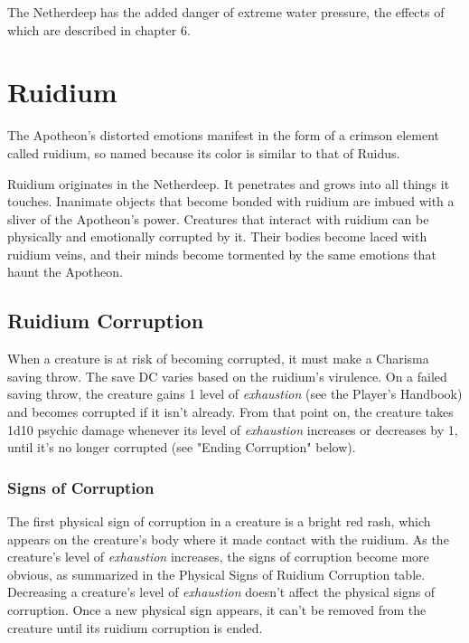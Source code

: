 \documentclass[a4paper, 11pt, bg=full, twocolumn, nooutline]{dndbook}
\begin{document}
The Netherdeep has the added danger of extreme water pressure, the effects of which are described in chapter 6.
\section{Ruidium}

The Apotheon's distorted emotions manifest in the form of a crimson element called ruidium, so named because its color is similar to that of Ruidus.

Ruidium originates in the Netherdeep. It penetrates and grows into all things it touches. Inanimate objects that become bonded with ruidium are imbued with a sliver of the Apotheon's power. Creatures that interact with ruidium can be physically and emotionally corrupted by it. Their bodies become laced with ruidium veins, and their minds become tormented by the same emotions that haunt the Apotheon.

\subsection{Ruidium Corruption}

When a creature is at risk of becoming corrupted, it must make a Charisma saving throw. The save DC varies based on the ruidium's virulence. On a failed saving throw, the creature gains 1 level of \textit{exhaustion} (see the Player's Handbook) and becomes corrupted if it isn't already. From that point on, the creature takes 1d10 psychic damage whenever its level of \textit{exhaustion} increases or decreases by 1, until it's no longer corrupted (see "Ending Corruption" below).

\subsubsection{Signs of Corruption}

The first physical sign of corruption in a creature is a bright red rash, which appears on the creature's body where it made contact with the ruidium. As the creature's level of \textit{exhaustion} increases, the signs of corruption become more obvious, as summarized in the Physical Signs of Ruidium Corruption table. Decreasing a creature's level of \textit{exhaustion} doesn't affect the physical signs of corruption. Once a new physical sign appears, it can't be removed from the creature until its ruidium corruption is ended.
\end{document}
